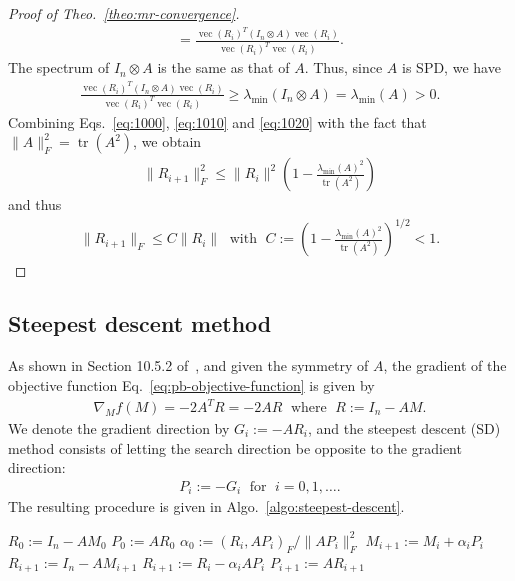 \documentclass[numbers,webpdf,imanum]{ima-authoring-template}%
\theoremstyle{thmstyletwo}%
\numberwithin{equation}{section}
\begin{document}
\begin{proof}[Proof of Theo.~\ref{theo:mr-convergence}]
\begin{align}
=\frac{\operatorname{vec}(R_i)^T(I_n\otimes A)\operatorname{vec}(R_i)}{\operatorname{vec}(R_i)^T\operatorname{vec}(R_i)}.
\end{align}
The spectrum of $I_n\otimes A$ is the same as that of $A$.
Thus, since $A$ is SPD, we have 
\begin{align}\label{eq:1020}
\frac{\operatorname{vec}(R_i)^T(I_n\otimes A)\operatorname{vec}(R_i)}{\operatorname{vec}(R_i)^T\operatorname{vec}(R_i)}\geq \lambda_{\min}(I_n\otimes A)=\lambda_{\min}(A)>0.
\end{align}
Combining Eqs.~\eqref{eq:1000}, \eqref{eq:1010} and \eqref{eq:1020} with the fact that $\|A\|_F^2=\operatorname{tr}(A^2)$, we obtain
\begin{align}
\|R_{i+1}\|_F^2\leq\|R_i\|^2\left(1-\frac{\lambda_{\min}(A)^2}{\operatorname{tr}(A^2)}\right)
\end{align}
and thus
\begin{align}
\|R_{i+1}\|_F\leq C\|R_i\|
\;\text{ with }\;
C:=\left(1-\frac{\lambda_{\min}(A)^2}{\operatorname{tr}(A^2)}\right)^{1/2}<1. 
\end{align}

\end{proof}


\subsection{Steepest descent method}
As shown in Section 10.5.2 of~\cite{Saad2003SparseBook}, and given the symmetry of $A$, the gradient of the objective function Eq.~\eqref{eq:pb-objective-function} is given by
\begin{align}\label{eq:gradient}
\nabla_{M}f(M)=-2A^TR=-2AR
\;\text{ where }\;
R:=I_n-AM.
\end{align}
We denote the gradient direction by $G_i:=-AR_i$, and the steepest descent (SD) method consists of letting the search direction be opposite to the gradient direction:
\begin{align}
P_i:=-G_i
\;\text{ for }\;i=0,1,\dots.
\end{align}
The resulting procedure is given in Algo.~\ref{algo:steepest-descent}.

\begin{algorithm}[ht]
\caption{SD($A$, $M_0$, $\texttt{ExplicitResidualUpdate}$)}
\label{algo:steepest-descent}
\begin{algorithmic}[1]
\State $R_0:=I_n-AM_0$
\State $P_0:=AR_0$
\State $\alpha_0:=(R_i,AP_i)_F/\|AP_i\|_F^2$
\State $M_{i+1}:=M_{i}+\alpha_i P_{i}$
\State $R_{i+1}:=I_n-AM_{i+1}$
\Else
\State $R_{i+1}:=R_i-\alpha_i AP_i$
\EndIf
\State $P_{i+1}:=AR_{i+1}$
\EndFor
\end{algorithmic}
\end{algorithm}
\end{document}
